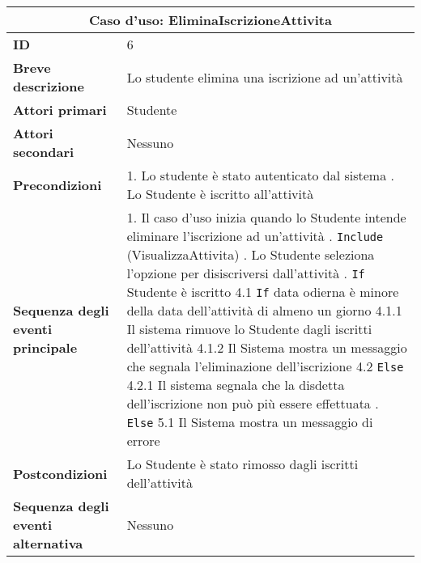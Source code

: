 \documentclass[11pt,a4paper]{report}
\begin{document}

\begin{table}[h!]
\centering
\renewcommand{\arraystretch}{1.3}
\begin{tabular}{|p{4.2cm}|p{10.2cm}|}
\hline
\multicolumn{2}{|c|}{\textbf{Caso d’uso: EliminaIscrizioneAttivita}} \\ \hline
\textbf{ID} & 6 \\ \hline
\textbf{Breve descrizione} & Lo studente elimina una iscrizione ad un'attività \\ \hline
\textbf{Attori primari} & Studente \\ \hline
\textbf{Attori secondari} & Nessuno \\ \hline
\textbf{Precondizioni} &
1. Lo studente è stato autenticato dal sistema \newline
2. Lo Studente è iscritto all'attività \\ \hline
\textbf{Sequenza degli eventi principale} &
1. Il caso d’uso inizia quando lo Studente intende eliminare l'iscrizione ad un'attività \newline
2. \texttt{Include} (VisualizzaAttivita) \newline
3. Lo Studente seleziona l’opzione per disiscriversi dall'attività \newline
4. \texttt{If} Studente è iscritto \newline
\hspace*{0.5cm} 4.1 \texttt{If} data odierna è minore della data dell'attività di almeno un giorno \newline
\hspace*{1cm} 4.1.1 Il sistema rimuove lo Studente dagli iscritti dell'attività \newline
\hspace*{1cm} 4.1.2 Il Sistema mostra un messaggio che segnala l’eliminazione dell’iscrizione \newline
\hspace*{0.5cm} 4.2 \texttt{Else} \newline
\hspace*{1cm} 4.2.1 Il sistema segnala che la disdetta dell’iscrizione non può più essere effettuata \newline
5. \texttt{Else} \newline
\hspace*{0.5cm} 5.1 Il Sistema mostra un messaggio di errore \\ \hline
\textbf{Postcondizioni} & Lo Studente è stato rimosso dagli iscritti dell'attività \\ \hline
\textbf{Sequenza degli eventi alternativa} & Nessuno \\ \hline
\end{tabular}
\end{table}
\end{document}
